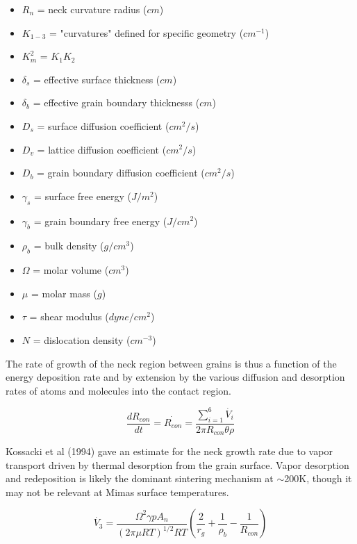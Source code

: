 \documentclass[11pt]{article} %
\begin{document}
	\begin{itemize}
	\item	$R_{n}$ = neck curvature radius ($cm$) 
	\item	$K_{1-3}$ = "curvatures" defined for specific geometry ($cm^{-1}$) 
	\item	$K_{m}^{2}$ = $K_{1}K_{2}$ 
	\item	$\delta_{s}$ = effective surface thickness ($cm$) 
	\item	$\delta_{b}$ = effective grain boundary thicknesss ($cm$) 
	\item	$D_{s}$ = surface diffusion coefficient ($cm^{2}/s$) 
	\item	$D_{v}$ = lattice diffusion coefficient ($cm^{2}/s$) 
	\item	$D_{b}$ = grain boundary diffusion coefficient ($cm^{2}/s$) 
	\item	$\gamma_{s}$ = surface free energy ($J/m^{2}$) 
	\item	$\gamma_{b}$ = grain boundary free energy ($J/cm^{2}$) 
	\item	$\rho_{b}$ = bulk density ($g/cm^{3}$) 
	\item	$\Omega$ = molar volume ($cm^{3}$) 
	\item	$\mu$ = molar mass ($g$)  
	\item	$\tau$ = shear modulus ($dyne/cm^{2}$) 
	\item	$N$ = dislocation density ($cm^{-3}$) 
	\end{itemize}
	
	The rate of growth of the neck region between grains is thus a function of the energy deposition rate and by extension by the various diffusion and desorption rates of atoms and molecules into the contact region.
	
	\begin{equation}
	\frac{dR_{con}}{dt} = \dot{R_{con}} = \frac{\sum_{i=1}^{6} \dot{V_{i}}}{2\pi R_{con} \theta \rho}
	\end{equation}
	
	Kossacki et al (1994) gave an estimate for the neck growth rate due to vapor transport driven by thermal desorption from the grain surface. Vapor desorption and redeposition is likely the dominant sintering mechanism at $\sim$200K, though it may not be relevant at Mimas surface temperatures.
	
	\begin{equation}
	\dot{V_{3}} = \frac{\Omega^{2}\gamma p A_{n}}{(2\pi\mu RT)^{1/2}RT} \left( \frac{2}{r_{g}} + \frac{1}{\rho_{b}} - \frac{1}{R_{con}} \right)
	\end{equation}
	
\end{document}
